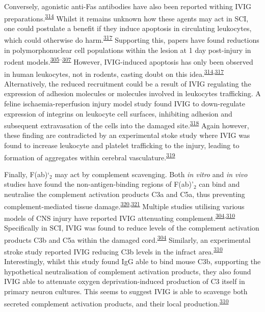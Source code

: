 \documentclass[
]{article}
\begin{document}
Conversely, agonistic anti-Fas antibodies have also been reported withing IVIG preparations.\textsuperscript{\protect\hyperlink{ref-altznauer_concurrent_2003}{314}}
Whilst it remains unknown how these agents may act in SCI, one could postulate a benefit if they induce apoptosis in circulating leukocytes, which could otherwise do harm.\textsuperscript{\protect\hyperlink{ref-schneider_ivig_2017}{317}}
Supporting this, papers have found reductions in polymorphonuclear cell populations within the lesion at 1 day post-injury in rodent models.\textsuperscript{\protect\hyperlink{ref-nguyen_immunoglobulin_2012}{305}--\protect\hyperlink{ref-gok_immunomodulation_2009}{307}}
However, IVIG-induced apoptosis has only been observed in human leukocytes, not in rodents, casting doubt on this idea.\textsuperscript{\protect\hyperlink{ref-altznauer_concurrent_2003}{314},\protect\hyperlink{ref-schneider_ivig_2017}{317}}
Alternatively, the reduced recruitment could be a result of IVIG regulating the expression of adhesion molecules or molecules involved in leukocytes trafficking.
A feline ischaemia-reperfusion injury model study found IVIG to down-regulate expression of integrins on leukocyte cell surfaces, inhibiting adhesion and subsequent extravasation of the cells into the damaged site.\textsuperscript{\protect\hyperlink{ref-gill_targeting_2005}{318}}
Again however, these finding are contradicted by an experimental stoke study where IVIG was found to increase leukocyte and platelet trafficking to the injury, leading to formation of aggregates within cerebral vasculature.\textsuperscript{\protect\hyperlink{ref-lapointe_ivig_2004}{319}}

Finally, F(ab)`\(_2\) may act by complement scavenging.
Both \emph{in vitro} and \emph{in vivo} studies have found the non-antigen-binding regions of F(ab)'\(_2\) can bind and neutralise the complement activation products C3a and C5a, thus preventing complement-mediated tissue damage.\textsuperscript{\protect\hyperlink{ref-basta_fab2-mediated_2003}{320},\protect\hyperlink{ref-basta_mechanism_1989}{321}}
Multiple studies utilising various models of CNS injury have reported IVIG attenuating complement.\textsuperscript{\protect\hyperlink{ref-brennan_ivig_2016}{304},\protect\hyperlink{ref-arumugam_intravenous_2007}{310}}
Specifically in SCI, IVIG was found to reduce levels of the complement activation products C3b and C5a within the damaged cord.\textsuperscript{\protect\hyperlink{ref-brennan_ivig_2016}{304}}
Similarly, an experimental stroke study reported IVIG reducing C3b levels in the infract area.\textsuperscript{\protect\hyperlink{ref-arumugam_intravenous_2007}{310}}
Interestingly, whilst this study found IgG able to bind mouse C3b, supporting the hypothetical neutralisation of complement activation products, they also found IVIG able to attenuate oxygen deprivation-induced production of C3 itself in primary neuron cultures.
This seems to suggest IVIG is able to scavenge both secreted complement activation products, and their local production.\textsuperscript{\protect\hyperlink{ref-arumugam_intravenous_2007}{310}}
\end{document}
